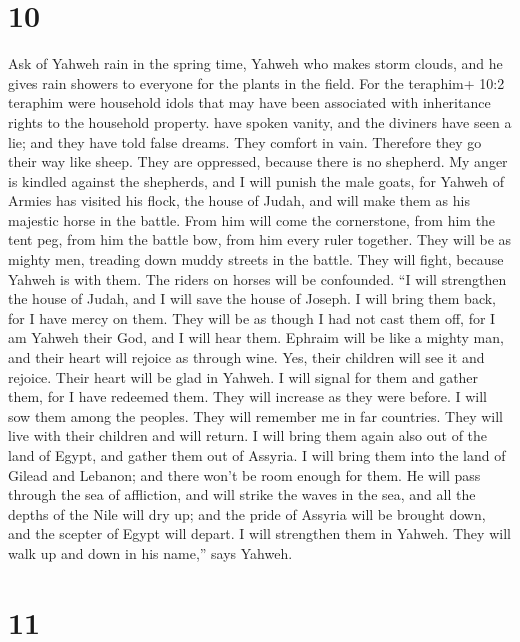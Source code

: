 \hypertarget{section-9}{%
\section{10}\label{section-9}}

 Ask of Yahweh rain in the spring time, Yahweh who makes
storm clouds, and he gives rain showers to everyone for the plants in
the field.  For the teraphim+ 10:2 teraphim were household
idols that may have been associated with inheritance rights to the
household property. have spoken vanity, and the diviners have seen a
lie; and they have told false dreams. They comfort in vain. Therefore
they go their way like sheep. They are oppressed, because there is no
shepherd.  My anger is kindled against the shepherds, and I
will punish the male goats, for Yahweh of Armies has visited his flock,
the house of Judah, and will make them as his majestic horse in the
battle.  From him will come the cornerstone, from him the
tent peg, from him the battle bow, from him every ruler together.
 They will be as mighty men, treading down muddy streets in
the battle. They will fight, because Yahweh is with them. The riders on
horses will be confounded.  ``I will strengthen the house of
Judah, and I will save the house of Joseph. I will bring them back, for
I have mercy on them. They will be as though I had not cast them off,
for I am Yahweh their God, and I will hear them.  Ephraim
will be like a mighty man, and their heart will rejoice as through wine.
Yes, their children will see it and rejoice. Their heart will be glad in
Yahweh.  I will signal for them and gather them, for I have
redeemed them. They will increase as they were before.  I
will sow them among the peoples. They will remember me in far countries.
They will live with their children and will return.  I will
bring them again also out of the land of Egypt, and gather them out of
Assyria. I will bring them into the land of Gilead and Lebanon; and
there won't be room enough for them.  He will pass through
the sea of affliction, and will strike the waves in the sea, and all the
depths of the Nile will dry up; and the pride of Assyria will be brought
down, and the scepter of Egypt will depart.  I will
strengthen them in Yahweh. They will walk up and down in his name,''
says Yahweh.

\hypertarget{section-10}{%
\section{11}\label{section-10}}

